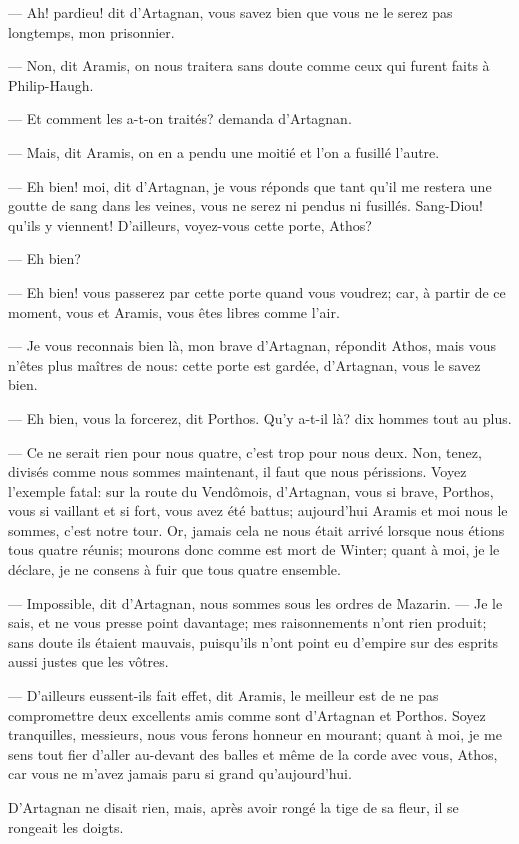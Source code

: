 — Ah! pardieu! dit d'Artagnan, vous savez bien que vous ne le serez pas longtemps, mon prisonnier.

— Non, dit Aramis, on nous traitera sans doute comme ceux qui furent faits à Philip-Haugh.

— Et comment les a-t-on traités? demanda d'Artagnan.

— Mais, dit Aramis, on en a pendu une moitié et l'on a fusillé l'autre.

— Eh bien! moi, dit d'Artagnan, je vous réponds que tant qu'il me restera une goutte de sang dans les veines, vous ne serez ni pendus ni fusillés. Sang-Diou! qu'ils y viennent! D'ailleurs, voyez-vous cette porte, Athos?

— Eh bien?

— Eh bien! vous passerez par cette porte quand vous voudrez; car, à partir de ce moment, vous et Aramis, vous êtes libres comme l'air.

— Je vous reconnais bien là, mon brave d'Artagnan, répondit Athos, mais vous n'êtes plus maîtres de nous: cette porte est gardée, d'Artagnan, vous le savez bien.

— Eh bien, vous la forcerez, dit Porthos. Qu'y a-t-il là? dix hommes tout au plus.

— Ce ne serait rien pour nous quatre, c'est trop pour nous deux. Non, tenez, divisés comme nous sommes maintenant, il faut que nous périssions. Voyez l'exemple fatal: sur la route du Vendômois, d'Artagnan, vous si brave, Porthos, vous si vaillant et si fort, vous avez été battus; aujourd'hui Aramis et moi nous le sommes, c'est notre tour. Or, jamais cela ne nous était arrivé lorsque nous étions tous quatre réunis; mourons donc comme est mort de Winter; quant à moi, je le déclare, je ne consens à fuir que tous quatre ensemble.

— Impossible, dit d'Artagnan, nous sommes sous les ordres de Mazarin.
— Je le sais, et ne vous presse point davantage; mes raisonnements n'ont rien produit; sans doute ils étaient mauvais, puisqu'ils n'ont point eu d'empire sur des esprits aussi justes que les vôtres.

— D'ailleurs eussent-ils fait effet, dit Aramis, le meilleur est de ne pas compromettre deux excellents amis comme sont d'Artagnan et Porthos. Soyez tranquilles, messieurs, nous vous ferons honneur en mourant; quant à moi, je me sens tout fier d'aller au-devant des balles et même de la corde avec vous, Athos, car vous ne m'avez jamais paru si grand qu'aujourd'hui.

D'Artagnan ne disait rien, mais, après avoir rongé la tige de sa fleur, il se rongeait les doigts.

